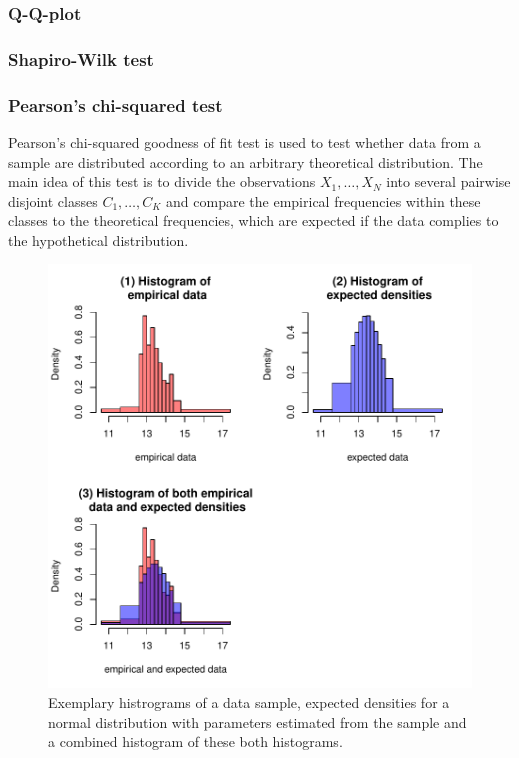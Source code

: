 \documentclass[a4paper, 12pt, titlepage, headsepline, listof = totoc, bibliography = totoc, numbers = noenddot]{scrartcl}
\begin{document}
\subsubsection{Q-Q-plot}

\subsubsection{Shapiro-Wilk test}

\subsubsection{Pearson's chi-squared test}\label{sec:chisq-theoretical}
Pearson's chi-squared goodness of fit test is used to test whether data from a sample are distributed according to an arbitrary theoretical distribution. The main idea of this test is to divide the observations $X_1, \dots, X_N$ into several pairwise disjoint classes $C_1, \dots, C_K$ and compare the empirical frequencies within these classes to the theoretical frequencies, which are expected if the data complies to the hypothetical distribution.
\begin{figure}[h!]
\includegraphics[width=\textwidth]{report-chisqSampleHist}
\caption{Exemplary histrograms of a data sample, expected densities for a normal distribution with parameters estimated from the sample and a combined histogram of these both histograms.}
\label{fig:chisqSampleHist}
\end{figure}
\end{document}
